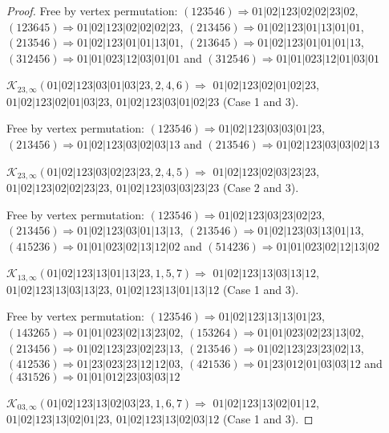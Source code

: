 \documentclass[12pt]{article}
\theoremstyle{plain}
\theoremstyle{definition}
\theoremstyle{remark}
\newcommand{\fancy}[1]{\mathcal{#1}}
\def\K{\fancy{K}}
\begin{document}
\begin{proof}
	
	
	Free by vertex permutation: $(1 2 3 5 4 6)\Rightarrow 01|02|123|02|02|23|02$, $(1 2 3 6 4 5)\Rightarrow 01|02|123|02|02|02|23$, $(2 1 3 4 5 6)\Rightarrow 01|02|123|01|13|01|01$, $(2 1 3 5 4 6)\Rightarrow 01|02|123|01|01|13|01$, $(2 1 3 6 4 5)\Rightarrow 01|02|123|01|01|01|13$, $(3 1 2 4 5 6)\Rightarrow 01|01|023|12|03|01|01$ and $(3 1 2 5 4 6)\Rightarrow 01|01|023|12|01|03|01$
	
	
	\bigskip
	
	$\K_{23,\infty}(01|02|123|03|01|03|23,2, 4, 6)\Rightarrow $ $01|02|123|02|01|02|23$, $01|02|123|02|01|03|23$, $01|02|123|03|01|02|23$ (Case 1 and 3).
	
	
	
	Free by vertex permutation: $(1 2 3 5 4 6)\Rightarrow 01|02|123|03|03|01|23$, $(2 1 3 4 5 6)\Rightarrow 01|02|123|03|02|03|13$ and $(2 1 3 5 4 6)\Rightarrow 01|02|123|03|03|02|13$
	
	
	\bigskip
	
	$\K_{23,\infty}(01|02|123|03|02|23|23,2, 4, 5)\Rightarrow $ $01|02|123|02|03|23|23$, $01|02|123|02|02|23|23$, $01|02|123|03|03|23|23$ (Case 2 and 3).
	
	
	
	Free by vertex permutation: $(1 2 3 5 4 6)\Rightarrow 01|02|123|03|23|02|23$, $(2 1 3 4 5 6)\Rightarrow 01|02|123|03|01|13|13$, $(2 1 3 5 4 6)\Rightarrow 01|02|123|03|13|01|13$, $(4 1 5 2 3 6)\Rightarrow 01|01|023|02|13|12|02$ and $(5 1 4 2 3 6)\Rightarrow 01|01|023|02|12|13|02$
	
	
	\bigskip
	
	$\K_{13,\infty}(01|02|123|13|01|13|23,1, 5, 7)\Rightarrow $ $01|02|123|13|03|13|12$, $01|02|123|13|03|13|23$, $01|02|123|13|01|13|12$ (Case 1 and 3).
	
	
	
	Free by vertex permutation: $(1 2 3 5 4 6)\Rightarrow 01|02|123|13|13|01|23$, $(1 4 3 2 6 5)\Rightarrow 01|01|023|02|13|23|02$, $(1 5 3 2 6 4)\Rightarrow 01|01|023|02|23|13|02$, $(2 1 3 4 5 6)\Rightarrow 01|02|123|23|02|23|13$, $(2 1 3 5 4 6)\Rightarrow 01|02|123|23|23|02|13$, $(4 1 2 5 3 6)\Rightarrow 01|23|023|23|12|12|03$, $(4 2 1 5 3 6)\Rightarrow 01|23|012|01|03|03|12$ and $(4 3 1 5 2 6)\Rightarrow 01|01|012|23|03|03|12$
	
	
	\bigskip
	
	$\K_{03,\infty}(01|02|123|13|02|03|23,1, 6, 7)\Rightarrow $ $01|02|123|13|02|01|12$, $01|02|123|13|02|01|23$, $01|02|123|13|02|03|12$ (Case 1 and 3).
	

\end{proof}
\end{document}
